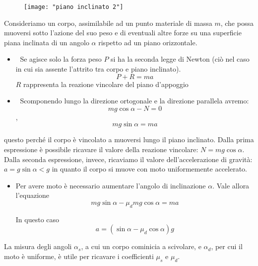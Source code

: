 \documentclass[a4paper, 12pt]{article} %
\begin{document}
\begin{figure}[h]
	\texttt{[image: "piano inclinato 2"]}
	\caption{}
	\label{fig:piano-inclinato-2}
\end{figure}
 
Consideriamo un corpo, assimilabile ad un punto materiale di massa $m$, che possa muoversi sotto l'azione del suo peso e di eventuali altre forze su una superficie piana inclinata di un angolo $\alpha$ rispetto ad un piano orizzontale.
				
		\begin{itemize}
			\item  Se agisce solo la forza peso $P$ si ha la seconda legge di Newton (ciò nel caso in cui sia assente l'attrito tra corpo e piano inclinato).
			$$P+R=ma$$
			$R$ rappresenta la reazione vincolare del piano d'appoggio
		\end{itemize}
	\begin{itemize}
		\item  Scomponendo lungo la direzione ortogonale e la direzione parallela avremo:
		$$mg\cos\alpha-N=0$$ , $$mg\sin\alpha=ma$$
	\end{itemize}
questo perché il corpo è vincolato a muoversi lungo il piano inclinato.
Dalla prima espressione è possibile ricavare il valore della reazione vincolare: $N=mg\cos\alpha$. Dalla seconda espressione, invece, ricaviamo il valore dell'accelerazione di gravità: $a=g\sin\alpha<g$ in quanto il corpo si muove con moto uniformemente accelerato.
\begin{itemize}
	\item Per avere moto è necessario aumentare l'angolo di inclinazione $\alpha$. Vale allora l'equazione
	$$mg\sin\alpha-\mu_{d}mg\cos\alpha=ma$$
	 
	In questo caso 
	$$a=(\sin\alpha-\mu_{d}\cos\alpha)g$$
\end{itemize}
La misura degli angoli $\alpha_{s}$, a cui un corpo cominicia a scivolare, e $\alpha_{d}$, per cui il moto è uniforme, è utile per ricavare i coefficienti $\mu_{s}$ e $\mu_{d}$.
 
\end{document}
